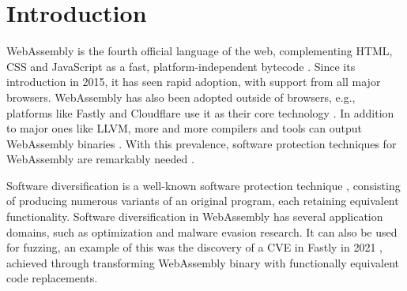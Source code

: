\documentclass[a4paper,fleqn]{cas-dc}
\newcommand{\Wasm}{WebAssembly\xspace}
\newcommand{\wasm}{\Wasm}
\begin{document}



\maketitle


\section{Introduction}


\Wasm is the fourth official language of the web, complementing HTML, CSS and JavaScript as a fast, platform-independent bytecode  \cite{haas2017bringing, WebAssemblyCoreSpecification}. 
Since its introduction in 2015, it has seen rapid adoption, with support from all major browsers. 
\wasm has also been adopted outside of browsers, e.g., platforms like Fastly and Cloudflare use it as their core technology \cite{fastly}.
In addition to major ones like LLVM, more and more compilers and tools can output \wasm binaries \cite{hilbig2021empirical, javy, kmm}. 
With this prevalence, software protection techniques for \wasm are remarkably needed \cite{avengers}.

Software diversification is a well-known software protection technique \cite{cohen1993operating, 4197960, 595185}, consisting of producing numerous variants of an original program, each retaining equivalent functionality. 
Software diversification in \wasm has several application domains, such as optimization \cite{superwasm} and malware evasion \cite{CABRERAARTEAGA2023103296} research. 
It can also be used for fuzzing, an example of this was the discovery of a CVE in Fastly in 2021 \cite{CVE}, achieved through transforming \wasm binary with functionally equivalent code replacements.
\end{document}
